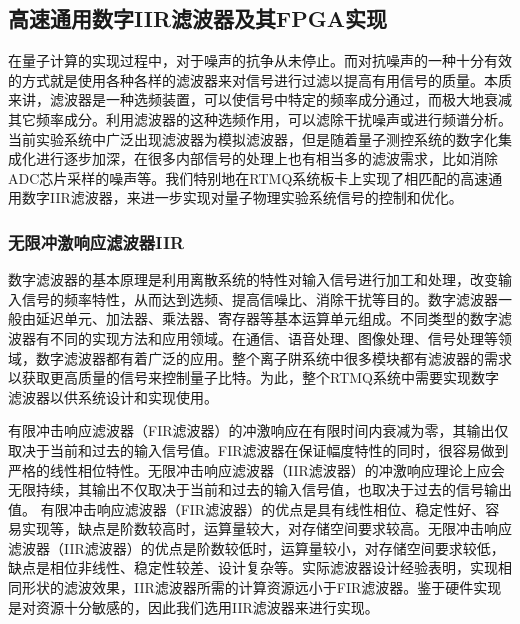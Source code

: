 \subsection[高速通用数字IIR滤波器及其FPGA实现]{高速通用数字IIR滤波器及其FPGA实现\label{section:digital_iir}}


在量子计算的实现过程中，对于噪声的抗争从未停止。而对抗噪声的一种十分有效的方式就是使用各种各样的滤波器来对信号进行过滤以提高有用信号的质量。本质来讲，滤波器是一种选频装置，可以使信号中特定的频率成分通过，而极大地衰减其它频率成分。利用滤波器的这种选频作用，可以滤除干扰噪声或进行频谱分析。
当前实验系统中广泛出现滤波器为模拟滤波器，但是随着量子测控系统的数字化集成化进行逐步加深，在很多内部信号的处理上也有相当多的滤波需求，比如消除ADC芯片采样的噪声等。我们特别地在RTMQ系统板卡上实现了相匹配的高速通用数字IIR滤波器，来进一步实现对量子物理实验系统信号的控制和优化。


\subsubsection[无限冲激响应滤波器IIR]{无限冲激响应滤波器IIR}
数字滤波器的基本原理是利用离散系统的特性对输入信号进行加工和处理，改变输入信号的频率特性，从而达到选频、提高信噪比、消除干扰等目的。数字滤波器一般由延迟单元、加法器、乘法器、寄存器等基本运算单元组成。不同类型的数字滤波器有不同的实现方法和应用领域。在通信、语音处理、图像处理、信号处理等领域，数字滤波器都有着广泛的应用。整个离子阱系统中很多模块都有滤波器的需求以获取更高质量的信号来控制量子比特。为此，整个RTMQ系统中需要实现数字滤波器以供系统设计和实现使用。

有限冲击响应滤波器（FIR滤波器）的冲激响应在有限时间内衰减为零，其输出仅取决于当前和过去的输入信号值。FIR滤波器在保证幅度特性的同时，很容易做到严格的线性相位特性。无限冲击响应滤波器（IIR滤波器）的冲激响应理论上应会无限持续，其输出不仅取决于当前和过去的输入信号值，也取决于过去的信号输出值。
有限冲击响应滤波器（FIR滤波器）的优点是具有线性相位、稳定性好、容易实现等，缺点是阶数较高时，运算量较大，对存储空间要求较高。无限冲击响应滤波器（IIR滤波器）的优点是阶数较低时，运算量较小，对存储空间要求较低，缺点是相位非线性、稳定性较差、设计复杂等。实际滤波器设计经验表明，实现相同形状的滤波效果，IIR滤波器所需的计算资源远小于FIR滤波器。鉴于硬件实现是对资源十分敏感的，因此我们选用IIR滤波器来进行实现。

